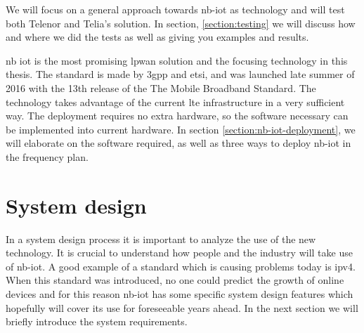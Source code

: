 \documentclass[USenglish]{ifimaster}  %
\begin{document}
We will focus on a general approach towards \acrshort{nb-iot} as technology and will test both Telenor and Telia's solution. In section, \vref{section:testing} we will discuss how and where we did the tests as well as giving you examples and results.

\acrfull{nb} \acrfull{iot} is the most promising \acrshort{lpwan} solution and the focusing technology in this thesis. The standard is made by \acrfull{3gpp} and \acrfull{etsi}, and was launched late summer of 2016 with the 13th release of the The Mobile Broadband Standard. The technology takes advantage of the current \acrshort{lte} infrastructure in a very sufficient way. The deployment requires no extra hardware, so the software necessary can be implemented into current hardware. In section \vref{section:nb-iot-deployment}, we will elaborate on the software required, as well as three ways to deploy \acrshort{nb-iot} in the frequency plan.

\section{System design}
In a system design process it is important to analyze the use of the new technology. It is crucial to understand how people and the industry will take use of \acrshort{nb-iot}. A good example of a standard which is causing problems today is \acrshort{ipv4}. When this standard was introduced, no one could predict the growth of online devices and for this reason \acrshort{nb-iot} has some specific system design features which hopefully will cover its use for foreseeable years ahead. In the next section we will briefly introduce the system requirements.
\end{document}
